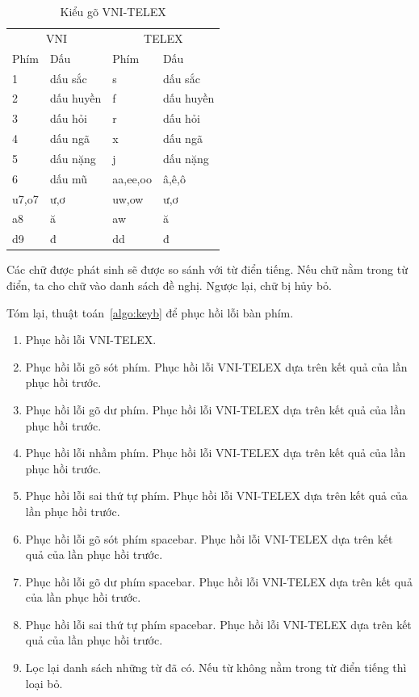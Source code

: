 \documentclass[a4paper,oneside,14pt]{extbook} %
\begin{document}
\begin{table}[htbp]
  \centering
  \begin{tabular}{ll|ll}
    \multicolumn{2}{c}{VNI}&\multicolumn{2}{c}{TELEX}\\
    Phím&Dấu&Phím&Dấu\\\hline
    1&dấu sắc&s&dấu sắc\\
    2&dấu huyền&f&dấu huyền\\
    3&dấu hỏi&r&dấu hỏi\\
    4&dấu ngã&x&dấu ngã\\
    5&dấu nặng&j&dấu nặng\\
    6&dấu mũ&aa,ee,oo&â,ê,ô\\
    u7,o7&ư,ơ&uw,ow&ư,ơ\\
    a8&ă&aw&ă\\
    d9&đ&dd&đ\\
  \end{tabular}
  \caption{Kiểu gõ VNI-TELEX}
  \label{tab:vni-telex}
\end{table}


Các chữ được phát sinh sẽ được so sánh với từ điển tiếng. Nếu chữ nằm trong từ
điển, ta cho chữ vào danh sách đề nghị. Ngược lại, chữ bị hủy bỏ.

Tóm lại, thuật toán~\ref{algo:keyb} để phục hồi lỗi bàn phím.
\begin{algo}
\caption{Phục hồi lỗi bàn phím}
\label{algo:keyb}
  \begin{enumerate}
  \item Phục hồi lỗi VNI-TELEX.
  \item Phục hồi lỗi gõ sót phím. Phục hồi lỗi VNI-TELEX dựa trên kết
    quả của lần phục hồi trước.
  \item Phục hồi lỗi gõ dư phím. Phục hồi lỗi VNI-TELEX dựa trên kết
    quả của lần phục hồi trước.
  \item Phục hồi lỗi nhầm phím. Phục hồi lỗi VNI-TELEX dựa trên kết
    quả của lần phục hồi trước.
  \item Phục hồi lỗi sai thứ tự phím. Phục hồi lỗi VNI-TELEX dựa trên kết
    quả của lần phục hồi trước.
  \item Phục hồi lỗi gõ sót phím spacebar. Phục hồi lỗi VNI-TELEX dựa trên kết
    quả của lần phục hồi trước.
  \item Phục hồi lỗi gõ dư phím spacebar. Phục hồi lỗi VNI-TELEX dựa trên kết
    quả của lần phục hồi trước.
  \item Phục hồi lỗi sai thứ tự phím spacebar. Phục hồi lỗi VNI-TELEX dựa trên kết
    quả của lần phục hồi trước.
  \item Lọc lại danh sách những từ đã có. Nếu từ không nằm trong từ
    điển tiếng thì loại bỏ.
  \end{enumerate}
\end{algo}
\end{document}
